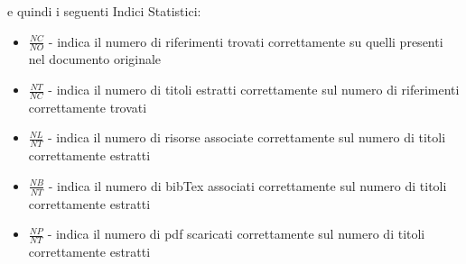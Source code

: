 e quindi i seguenti Indici Statistici:
\begin{itemize}
 \item \textbf{$\frac{NC}{NO}$} - indica il numero di riferimenti trovati correttamente su quelli presenti nel documento originale
 \item \textbf{$\frac{NT}{NC}$} - indica il numero di titoli estratti correttamente sul numero di riferimenti correttamente trovati
 \item \textbf{$\frac{NL}{NT}$} - indica il numero di risorse associate correttamente sul numero di titoli correttamente estratti
 \item \textbf{$\frac{NB}{NT}$} - indica il numero di bibTex associati correttamente sul numero di titoli correttamente estratti
 \item \textbf{$\frac{NP}{NT}$} - indica il numero di pdf scaricati correttamente sul numero di titoli correttamente estratti
\end{itemize}

